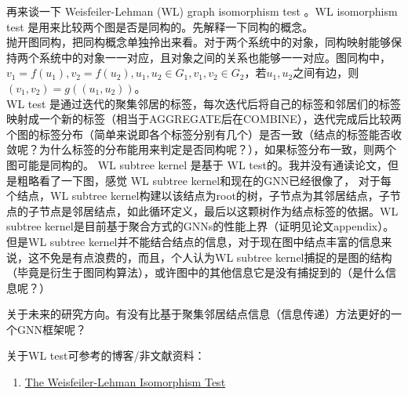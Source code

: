 \par 再来谈一下  Weisfeiler-Lehman (WL) graph isomorphism test 。WL isomorphism test 是用来比较两个图是否是同构的。先解释一下同构的概念。\\
抛开图同构，把同构概念单独拎出来看。对于两个系统中的对象，同构映射能够保持两个系统中的对象一一对应，且对象之间的关系也能够一一对应。图同构中，$v_1 = f(u_1), v_2 = f(u_2),u_1, u_2 \in G_1, v_1, v_2 \in G_2$，若$u_1, u_2$之间有边，则$(v_1, v_2) = g((u_1, u_2))$。\\
WL test 是通过迭代的聚集邻居的标签，每次迭代后将自己的标签和邻居们的标签映射成一个新的标签（相当于AGGREGATE后在COMBINE），迭代完成后比较两个图的标签分布（简单来说即各个标签分别有几个）是否一致（{\color{red}结点的标签能否收敛呢？为什么标签的分布能用来判定是否同构呢？}），如果标签分布一致，则两个图可能是同构的。
WL subtree kernel\cite{shervashidze2011weisfeiler} 是基于 WL test的。我并没有通读论文，但是粗略看了一下图，感觉 WL subtree kernel和现在的GNN已经很像了， 对于每个结点，WL subtree kernel构建以该结点为root的树，子节点为其邻居结点，子节点的子节点是邻居结点，如此循环定义，最后以这颗树作为结点标签的依据。WL subtree kernel是目前基于聚合方式的GNNs的性能上界（证明见论文appendix）。但是WL subtree kernel并不能结合结点的信息，对于现在图中结点丰富的信息来说，这不免是有点浪费的，而且，个人认为WL subtree kernel捕捉的是图的结构（毕竟是衍生于图同构算法），或许图中的其他信息它是没有捕捉到的（{\color{red}是什么信息呢？}） 

\par 关于未来的研究方向。有没有比基于聚集邻居结点信息（信息传递）方法更好的一个GNN框架呢？

关于WL test可参考的博客/非文献资料：
\begin{enumerate}
    \item \href{https://www.davidbieber.com/post/2019-05-10-weisfeiler-lehman-isomorphism-test/}{The Weisfeiler-Lehman Isomorphism Test}
\end{enumerate}
